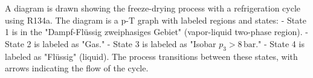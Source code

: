 A diagram is drawn showing the freeze-drying process with a refrigeration cycle using R134a. The diagram is a p-T graph with labeled regions and states:  
- State 1 is in the "Dampf-Flüssig zweiphasiges Gebiet" (vapor-liquid two-phase region).  
- State 2 is labeled as "Gas."  
- State 3 is labeled as "Isobar \( p_3 > 8 \, \text{bar} \)."  
- State 4 is labeled as "Flüssig" (liquid).  
The process transitions between these states, with arrows indicating the flow of the cycle.